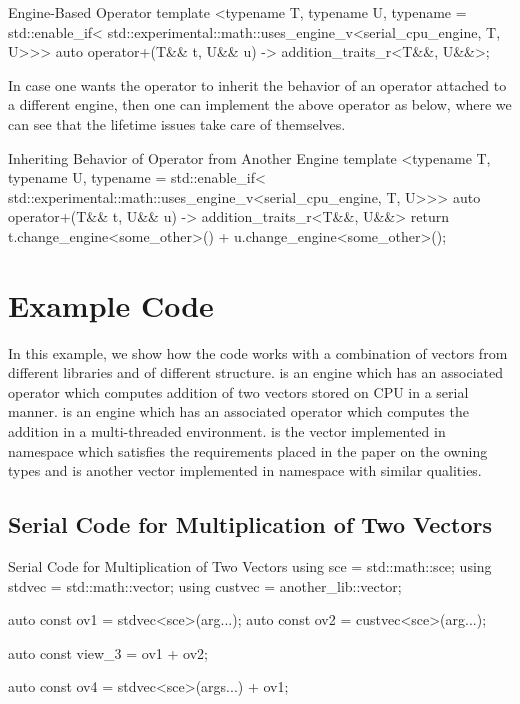 \documentclass[oneside,11pt,a4paper]{jbarticle}
\begin{document}
\begin{codecpp}{Engine-Based Operator}
template <typename T,
          typename U,
          typename = std::enable_if<
            std::experimental::math::uses_engine_v<serial_cpu_engine, T, U>>>
auto operator+(T&& t, U&& u) -> addition_traits_r<T&&, U&&>;
\end{codecpp}

In case one wants the operator to inherit the behavior of an operator attached
to a different engine, then one can implement the above operator as below, where
we can see that the lifetime issues take care of themselves.

\begin{codecpp}{Inheriting Behavior of Operator from Another Engine}
template <typename T,
          typename U,
          typename = std::enable_if<
            std::experimental::math::uses_engine_v<serial_cpu_engine, T, U>>>
auto operator+(T&& t, U&& u) -> addition_traits_r<T&&, U&&>
{
  return t.change_engine<some_other>() + u.change_engine<some_other>();
}
\end{codecpp}

\section{Example Code}
In this example, we show how the code works with a combination of vectors from
different libraries and of different structure.  is an engine
which has an associated operator  which computes addition
of two vectors stored on CPU in a serial manner.  is an engine
which has an associated operator  which computes the
addition in a multi-threaded environment.  is the
vector implemented in  namespace which satisfies the
requirements placed in the paper on the owning types and
 is another vector implemented in
 namespace with similar qualities.

\subsection{Serial Code for Multiplication of Two Vectors}
\begin{codecpp}{Serial Code for Multiplication of Two Vectors}
  using sce = std::math::sce;
  using stdvec = std::math::vector;
  using custvec = another_lib::vector;

  auto const ov1 = stdvec<sce>(arg...);
  auto const ov2 = custvec<sce>(arg...);

  auto const view_3 = ov1 + ov2;

  auto const ov4 = stdvec<sce>(args...) + ov1;
\end{codecpp}
\end{document}
